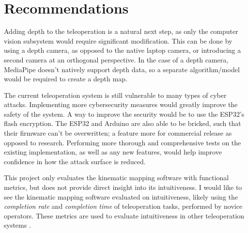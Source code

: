 \chapter{Recommendations}\label{ch:rec}


Adding depth to the teleoperation is a natural next step, as only the computer vision subsystem would require significant modification. This can be done by using a depth camera, as opposed to the native laptop camera, or introducing a second camera at an orthogonal perspective. In the case of a depth camera, MediaPipe doesn't natively support depth data, so a separate algorithm/model would be required to create a depth map.

The current teleoperation system is still vulnerable to many types of cyber attacks. Implementing more cybersecurity measures would greatly improve the safety of the system. A way to improve the security would be to use the ESP32's flash encryption. The ESP32 and Arduino are also able to be bricked, such that their firmware can't be overwritten; a feature more for commercial release as opposed to research. Performing more thorough and comprehensive tests on the existing implementation, as well as any new features, would help improve confidence in how the attack surface is reduced.

This project only evaluates the kinematic mapping software with functional metrics, but does not provide direct insight into its intuitiveness. I would like to see the kinematic mapping software evaluated on intuitiveness, likely using the \textit{completion rate} and \textit{completion time} of teleoperation tasks, performed by novice operators. These metrics are used to evaluate intuitiveness in other teleoperation systems \cite{bib:teleoperation_intuitive_using_MediaPipeHands}\cite{bib:teleoperation_continuous_space}\cite{bib:teleoperation_continuous_space_2}.
